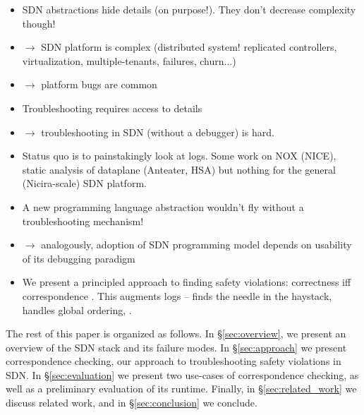 \begin{itemize}
\item SDN abstractions hide details (on purpose!). They don't decrease
complexity though!
\item $\rightarrow$ SDN platform is complex (distributed system! replicated controllers,
virtualization, multiple-tenants, failures, churn...)
\item $\rightarrow$ platform bugs are common
\item Troubleshooting requires access to details
\item $\rightarrow$ troubleshooting in SDN (without a debugger) is hard.
\item Status quo is to painstakingly look at logs. Some work on NOX (NICE), static
analysis of dataplane (Anteater, HSA) but nothing for the general
(Nicira-scale) SDN platform.
\item A new programming language abstraction wouldn't fly without a troubleshooting
mechanism!
\item $\rightarrow$ analogously, adoption of SDN programming model depends on usability of its
debugging paradigm  
\item We present a principled approach to finding safety violations: correctness iff correspondence . This augments logs -- finds the needle in the haystack, handles
global ordering, \etc.
\end{itemize}

The rest of this paper is organized as follows. In \S\ref{sec:overview},
we present an overview of the SDN stack and its failure modes.
In \S\ref{sec:approach} we present correspondence checking, our approach to
troubleshooting safety violations in SDN. In \S\ref{sec:evaluation} we present
two use-cases of correspondence checking, as well as a preliminary evaluation
of its runtime. Finally, in \S\ref{sec:related_work} we discuss related work,
and in \S\ref{sec:conclusion} we conclude.
